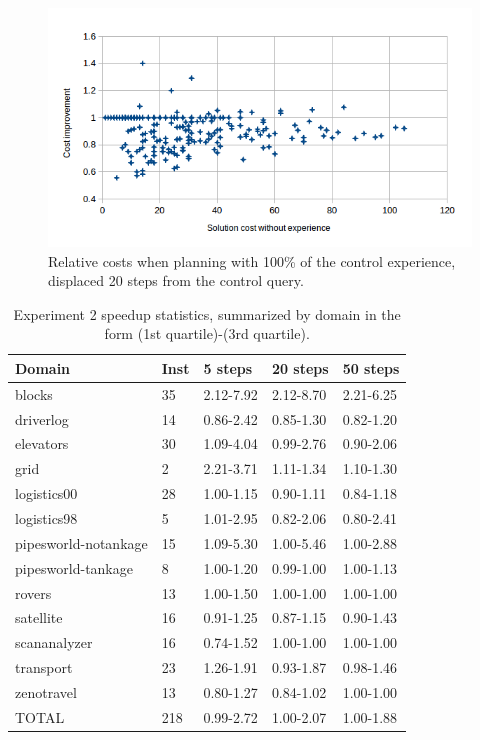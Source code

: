 \documentclass[letterpaper]{article}
\begin{document}
\begin{figure}
	\begin{center}
	\includegraphics[scale=0.5]{Cost_100_20.png}
	\end{center}
	\caption{Relative costs when planning with 100\% of the control experience, displaced 20 steps from the control query.}
	 \label{fig:c_100_20}
\end{figure}


\begin{table}
	\begin{center}
	    \begin{tabular}{| l | l | l | l | l |}
	    \hline
	    Domain & Inst & 5 steps & 20 steps & 50 steps
	    \\ \hline
	    blocks & 35 & 2.12-7.92 & 2.12-8.70 & 2.21-6.25
	    \\ \hline
	    driverlog & 14 & 0.86-2.42 & 0.85-1.30 & 0.82-1.20
	    \\ \hline
	    elevators & 30 & 1.09-4.04 & 0.99-2.76 & 0.90-2.06
	    \\ \hline
	    grid & 2 & 2.21-3.71 & 1.11-1.34 & 1.10-1.30
	    \\ \hline
	    logistics00 & 28 & 1.00-1.15 & 0.90-1.11 & 0.84-1.18
	    \\ \hline
	    logistics98 & 5 & 1.01-2.95 & 0.82-2.06 & 0.80-2.41
	    \\ \hline
	    pipesworld-notankage & 15 & 1.09-5.30 & 1.00-5.46 & 1.00-2.88
	    \\ \hline
	    pipesworld-tankage & 8 & 1.00-1.20 & 0.99-1.00 & 1.00-1.13
	    \\ \hline
	    rovers & 13 & 1.00-1.50 & 1.00-1.00 & 1.00-1.00
	    \\ \hline
	    satellite & 16 & 0.91-1.25 & 0.87-1.15 & 0.90-1.43
	    \\ \hline
	    scananalyzer & 16 & 0.74-1.52 & 1.00-1.00 & 1.00-1.00
	    \\ \hline
	    transport & 23 & 1.26-1.91 & 0.93-1.87 & 0.98-1.46
	    \\ \hline
	    zenotravel & 13 & 0.80-1.27 & 0.84-1.02 & 1.00-1.00
	    \\ \hline
	    TOTAL & 218 & 0.99-2.72 & 1.00-2.07 & 1.00-1.88
	    \\ \hline
	    \end{tabular}
	\end{center}
	\caption{Experiment 2 speedup statistics, summarized by domain in the form (1st quartile)-(3rd quartile).}
	 \label{tab:walk}
\end{table}
\end{document}
